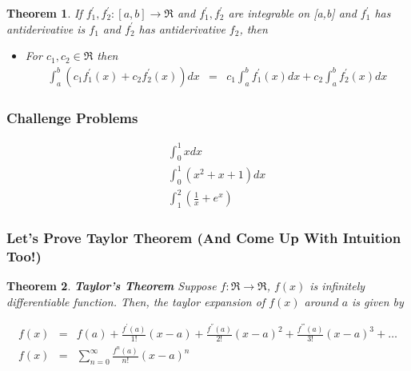 \documentclass{beamer}
\newtheorem{thm}{Theorem}
\numberwithin{equation}{section}
\begin{document}
\begin{frame}

\begin{thm} If $f_{1}^{'}, f_{2}^{'}: [a,b] \rightarrow \Re$ and $f_{1}^{'}, f_{2}^{'} $ are integrable on [a,b] and $f_1^{'}$ has antiderivative is $f_1$ and $f_2^{'}$ has antiderivative $f_2$, then
\begin{itemize}
\item[ii)] For $c_{1}, c_{2} \in \Re$ then
\begin{eqnarray}
\int_{a}^{b} (c_{1} f_{1}^{'}(x) + c_{2} f_{2}^{'}(x) ) dx & = & c_{1} \int_{a}^{b} f_{1}^{'}(x)dx  + c_{2} \int_{a}^{b}f_{2}^{'}(x) dx \nonumber 
\end{eqnarray}
\end{itemize}
\end{thm}

\end{frame}

\begin{frame}
\frametitle{Challenge Problems}


\begin{eqnarray}
& & \int_{0}^{1} xdx \nonumber \\
&  & \int_{0}^{1}(x^{2} + x + 1)dx \nonumber \\
&  & \int_{1}^{2}(\frac{1}{x}  + e^{x} ) \nonumber 
\end{eqnarray}



\end{frame}




\begin{frame}
\frametitle{Let's Prove Taylor Theorem (And Come Up With Intuition Too!)}


\begin{thm}
\textbf{Taylor's Theorem}
Suppose $f:\Re \rightarrow \Re$, $f(x)$ is infinitely differentiable function.  Then, the taylor expansion of $f(x)$ around \alert{$a$} is given by 

\begin{eqnarray}
f(x) & = & f(a) + \frac{f^{'}(a)}{1!} (x- a) + \frac{f^{''}(a)}{2!} (x - a)^2 + \frac{f^{'''}(a)}{3!}(x- a)^3 + \hdots \nonumber \\
f(x) & = & \sum_{n=0}^{\infty } \frac{f^{n} (a) }{n!} (x - a)^n \nonumber
\end{eqnarray}

\end{thm}


\end{frame}
\end{document}

